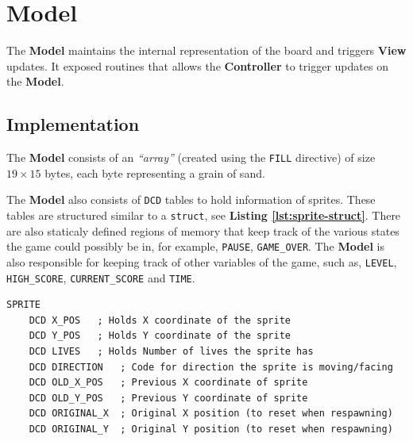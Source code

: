   \section{Model}


  The \textbf{Model} maintains the internal representation of the board and triggers \textbf{View} updates. It exposed routines that allows the
  \textbf{Controller} to trigger updates on the \textbf{Model}.

    \subsection{Implementation}

    The \textbf{Model} consists of an \emph{``array''} (created using the \texttt{FILL} directive)
    of size $19 \times 15$ bytes, each byte representing a grain of sand.

    The \textbf{Model} also consists of \texttt{DCD} tables to hold information of sprites. These tables are structured similar to a \texttt{struct}, see \textbf{Listing \ref{lst:sprite-struct}}.
    There are also staticaly defined regions of memory that keep track of the various states the game could possibly be in,
    for example, \texttt{PAUSE}, \texttt{GAME\_OVER}.
    The \textbf{Model} is also responsible for keeping track of other variables of the game,
    such as, \texttt{LEVEL}, \texttt{HIGH\_SCORE}, \texttt{CURRENT\_SCORE} and \texttt{TIME}.


    \begin{lstlisting}[caption={Structure for \texttt{SPRITE} data},label={lst:sprite-struct}]
SPRITE
	DCD X_POS	; Holds X coordinate of the sprite
	DCD Y_POS	; Holds Y coordinate of the sprite
	DCD LIVES	; Holds Number of lives the sprite has
	DCD DIRECTION	; Code for direction the sprite is moving/facing
	DCD OLD_X_POS	; Previous X coordinate of sprite
	DCD OLD_Y_POS	; Previous Y coordinate of sprite
	DCD ORIGINAL_X	; Original X position (to reset when respawning)
	DCD ORIGINAL_Y	; Original Y position (to reset when respawning)

    \end{lstlisting}

